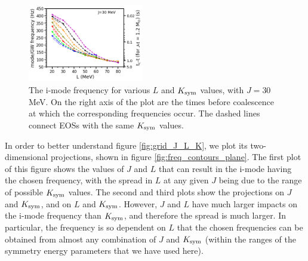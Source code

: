\documentclass[fleqn,usenatbib]{mnras}
\begin{document}
\begin{figure}
\centering
\includegraphics[width=0.45\textwidth,angle=0]{L_K_f_tc_J30.png}
\caption{The i-mode frequency for various $L$ and $K_{\rm sym}$ values, with $J=30$ MeV. On the right axis of the plot are the times before coalescence at which the corresponding frequencies occur. The dashed lines connect EOSs with the same $K_{\rm sym}$ values.}
\label{fig:L_vs_K_vs_f+tc}
\end{figure}


In order to better understand figure \ref{fig:grid_J_L_K}, we plot its two-dimensional projections, shown in figure \ref{fig:freq_contours_plane}. The first plot of this figure shows the values of $J$ and $L$ that can result in the i-mode having the chosen frequency, with the spread in $L$ at any given $J$ being due to the range of possible $K_{\rm sym}$ values. The second and third plots show the projections on $J$ and $K_{\rm sym}$, and on $L$ and $K_{\rm sym}$. However, $J$ and $L$ have much larger impacts on the i-mode frequency than $K_{\rm sym}$, and therefore the spread is much larger. In particular, the frequency is so dependent on $L$ that the chosen frequencies can be obtained from almost any combination of $J$ and $K_{\rm sym}$ (within the ranges of the symmetry energy parameters that we have used here).
\end{document}
